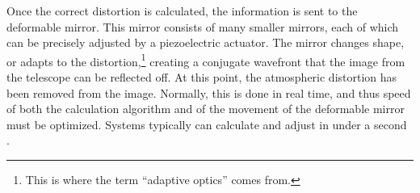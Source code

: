 Once the correct distortion is calculated, the information is sent to the deformable mirror. This mirror consists of many smaller mirrors, each of which can be precisely adjusted by a piezoelectric actuator. The mirror changes shape, or adapts to the distortion,\footnote{This is where the term ``adaptive optics'' comes from.} creating a conjugate wavefront that the image from the telescope can be reflected off. At this point, the atmospheric distortion has been removed from the image. Normally, this is done in real time, and thus speed of both the calculation algorithm and of the movement of the deformable mirror must be optimized. Systems typically can calculate and adjust in under a second \cite{Wizinowich2006}.




